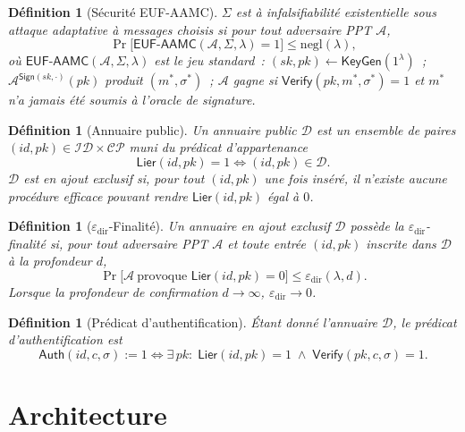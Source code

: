\documentclass[11pt,a4paper]{article}
\newtheorem{definition}[theoreme]{Définition}
\begin{document}
\begin{definition}[Sécurité EUF-AAMC]
  $\Sigma$ est à \emph{infalsifiabilité existentielle sous attaque adaptative
  à messages choisis} si pour tout adversaire PPT $\mathcal{A}$,
  \[
    \Pr\bigl[\mathsf{EUF\text{-}AAMC}(\mathcal{A},\Sigma,\lambda) = 1\bigr]
    \leq \mathrm{negl}(\lambda),
  \]
  où $\mathsf{EUF\text{-}AAMC}(\mathcal{A},\Sigma,\lambda)$ est le jeu
  standard~: $(sk,pk) \gets \mathsf{KeyGen}(1^\lambda)$~;
  $\mathcal{A}^{\mathsf{Sign}(sk,\cdot)}(pk)$ produit $(m^*, \sigma^*)$~;
  $\mathcal{A}$ gagne si $\mathsf{Verify}(pk, m^*, \sigma^*) = 1$
  et $m^*$ n'a jamais été soumis à l'oracle de signature.
\end{definition}

\begin{definition}[Annuaire public]
  Un \emph{annuaire public} $\mathcal{D}$ est un ensemble de paires
  $(id, pk) \in \mathcal{ID} \times \mathcal{CP}$ muni du prédicat
  d'appartenance
  \[
    \mathsf{Lier}(id, pk) = 1 \iff (id, pk) \in \mathcal{D}.
  \]
  $\mathcal{D}$ est \emph{en ajout exclusif} si, pour tout $(id, pk)$
  une fois inséré, il n'existe aucune procédure efficace pouvant rendre
  $\mathsf{Lier}(id, pk)$ égal à $0$.
\end{definition}

\begin{definition}[$\varepsilon_{\mathrm{dir}}$-Finalité]
  Un annuaire en ajout exclusif $\mathcal{D}$ possède la
  \emph{$\varepsilon_{\mathrm{dir}}$-finalité} si, pour tout adversaire PPT
  $\mathcal{A}$ et toute entrée $(id, pk)$ inscrite dans $\mathcal{D}$ à la
  profondeur $d$,
  \[
    \Pr\bigl[\mathcal{A}\ \text{provoque } \mathsf{Lier}(id,pk) = 0\bigr]
    \leq \varepsilon_{\mathrm{dir}}(\lambda, d).
  \]
  Lorsque la profondeur de confirmation $d \to \infty$,
  $\varepsilon_{\mathrm{dir}} \to 0$.
\end{definition}

\begin{definition}[Prédicat d'authentification]
  Étant donné l'annuaire $\mathcal{D}$, le \emph{prédicat d'authentification}
  est
  \[
    \mathsf{Auth}(id, c, \sigma) := 1 \iff
    \exists\, pk :\;
    \mathsf{Lier}(id, pk) = 1
    \;\wedge\;
    \mathsf{Verify}(pk, c, \sigma) = 1.
  \]
\end{definition}

\section{Architecture}
\end{document}
